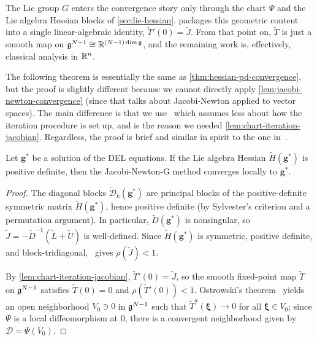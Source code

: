 \begin{remark}\label{rmk:where-manifold-enters}
	The Lie group $G$ enters the convergence story only through the chart $\Psi$ and the Lie algebra Hessian blocks of \cref{sec:lie-hessian}.  packages this geometric content into a single linear-algebraic identity, $\widetilde{T}'(0) = \widetilde{J}$. From that point on, $\widetilde{T}$ is just a smooth map on ${\mathfrak{g}}^{N-1} \cong {\mathbb{R}}^{(N-1)\dim{\mathfrak{g}}}$, and the remaining work is, effectively, classical analysis in ${\mathbb{R}}^n$.
\end{remark}

The following theorem is essentially the same as \cref{thm:hessian-pd-convergence}, but the proof is slightly different because we cannot directly apply \cref{lem:jacobi-newton-convergence} (since that talks about Jacobi-Newton applied to vector spaces). The main difference is that we use~\cite[Thm.~10.1.3]{ortegaIterativeSolutionNonlinear1970} which assumes less about how the iteration procedure is set up, and is the reason we needed \cref{lem:chart-iteration-jacobian}. Regardless, the proof is brief and similar in spirit to the one in~\cite[Prop.~4.5]{ferraroParallelIterativeMethod2025}.

\begin{theorem}\label{thm:lie-group-convergence}
	Let $\mathbf{g}^*$ be a solution of the DEL equations. If the Lie algebra Hessian $\widetilde{H}(\mathbf{g}^*)$ is positive definite, then the Jacobi-Newton-G method converges locally to $\mathbf{g}^*$.
\end{theorem}

\begin{proof}
	The diagonal blocks $\widetilde{\mathcal{D}}_k(\mathbf{g}^*)$ are principal blocks of the positive-definite symmetric matrix $\widetilde{H}(\mathbf{g}^*)$, hence positive definite (by Sylvester's criterion and a permutation argument). In particular, $\widetilde{D}(\mathbf{g}^*)$ is nonsingular, so $\widetilde{J} = -\widetilde{D}^{-1}(\widetilde{L}+\widetilde{U})$ is well-defined. Since $\widetilde{H}(\mathbf{g}^*)$ is symmetric, positive definite, and block-tridiagonal,~\cite[Thm.~6.38]{axelssonIterativeSolutionMethods1994} gives $\rho(\widetilde{J}) < 1$.

	By \cref{lem:chart-iteration-jacobian}, $\widetilde{T}'(0) = \widetilde{J}$, so the smooth fixed-point map $\widetilde{T}$ on ${\mathfrak{g}}^{N-1}$ satisfies $\widetilde{T}(0) = 0$ and $\rho(\widetilde{T}'(0)) < 1$. Ostrowski's theorem~\cite[Thm.~10.1.3]{ortegaIterativeSolutionNonlinear1970} yields an open neighborhood $V_0 \ni 0$ in ${\mathfrak{g}}^{N-1}$ such that $\widetilde{T}^a(\boldsymbol\xi) \to 0$ for all $\boldsymbol\xi \in V_0$; since $\Psi$ is a local diffeomorphism at $0$, there is a convergent neighborhood given by $\mathcal{D} = \Psi(V_0)$.
\end{proof}

